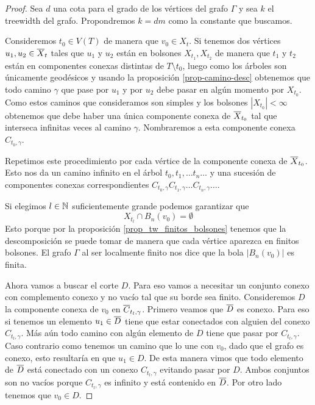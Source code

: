 \documentclass[tesis.tex]{subfiles}
\begin{document}
\begin{proof}
	Sea $d$ una cota para el grado de los vértices del grafo $\Gamma$ y sea $k$ el treewidth del grafo.
	Propondremos $k = dm$ como la constante que buscamos.
	
	Consideremos $t_0 \in V(T)$ de manera que $v_0 \in X_t$.
	Si tenemos dos vértices $u_1,u_2 \in \overline X_t$ tales que $u_1$ y $u_2$ están en bolsones $X_{t_1}, X_{t_2}$ de manera que $t_1$ y $t_2$ están en componentes conexas distintas de $T \setminus t_0$, luego como los árboles son únicamente geodésicos y usando la proposición \ref{prop-camino-desc} obtenemos que todo camino $\gamma$ que pase por $u_1$ y por $u_2$ debe pasar en algún momento por $X_{{t}_0}$.
	Como estos caminos que consideramos son simples y los bolsones $|X_{t_0}| < \infty$ obtenemos que debe haber una única componente conexa de $\overline X_{t_0}$ tal que interseca infinitas veces al camino $\gamma$.
	Nombraremos a esta componente conexa $C_{t_0,\gamma}$.
	
	Repetimos este procedimiento por cada vértice de la componente conexa de $\overline X_{t_0}$.
	Esto nos da un camino infinito en el árbol $t_0,t_1, \dots t_n \dots$ y una sucesión de componentes conexas correspondientes $C_{t_0,\gamma} C_{t_1,\gamma} \dots C_{t_n, \gamma} \dots$.
	
	Si elegimos $l \in \mathbb{N}$ suficientemente grande podemos garantizar que
	\[
		X_{t_l} \cap B_n(v_0) = \emptyset
	\]
	Esto porque por la proposición \ref{prop_tw_finitos_bolsones} tenemos que la descomposición se puede tomar de manera que cada vértice aparezca en finitos bolsones.
	El grafo $\Gamma$ al ser localmente finito nos dice que la bola $|B_n(v_0)|$ es finita.
	
	Ahora vamos a buscar el corte $D$. 
	Para eso vamos a necesitar un conjunto conexo con complemento conexo y no vacío tal que su borde sea finito.
	Consideremos $D$ la componente conexa de $v_0$ en $\overline C_{t_l, \gamma}$.
	Primero veamos que $\overline D$ es conexo.
	Para eso si tenemos un elemento $u_1 \in \overline D$ tiene que estar conectados con alguien del conexo $C_{t_l, \gamma}$.
	Más aún todo camino con algún elemento de $D$ tiene que pasar por $C_{t_l, \gamma}$.
	Caso contrario como tenemos un camino que lo une con $v_0$, dado que el grafo es conexo, esto resultaría en que $u_1 \in D$.
	De esta manera vimos que todo elemento de $\overline D$ está conectado con un conexo $C_{t_l, \gamma}$ evitando pasar por $D$.
	Ambos conjuntos son no vacíos porque $C_{t_l, \gamma}$ es infinito y está contenido en $\overline D$.
	Por otro lado tenemos que $v_0 \in D$.
	

\end{proof}
\end{document}
